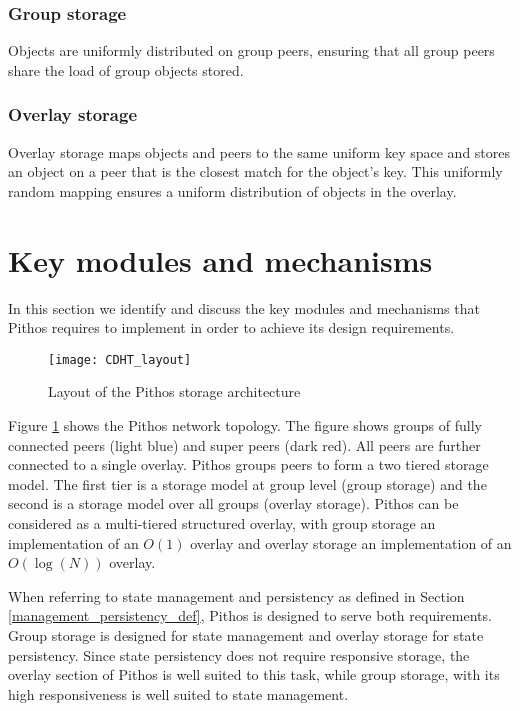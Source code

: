 \subsubsection{Group storage}

Objects are uniformly distributed on group peers, ensuring that all group peers share the load of group objects stored.

\subsubsection{Overlay storage}

Overlay storage maps objects and peers to the same uniform key space and stores an object on a peer that is the closest match for the object's key. This uniformly random mapping ensures a uniform distribution of objects in the overlay.

\section{Key modules and mechanisms}
\label{key_modules_mechs}

In this section we identify and discuss the key modules and mechanisms that Pithos requires to implement in order to achieve its design requirements.

\begin{figure}[htbp]
 \centering
 \texttt{[image: CDHT\_layout]}
 \caption{Layout of the Pithos storage architecture}
 \label{fig_pithos}
\end{figure}
%
Figure \ref{fig_pithos} shows the Pithos network topology. The figure shows groups of fully connected peers (light blue) and super peers (dark red). All peers are further connected to a single overlay. Pithos groups peers to form a two tiered storage model. The first tier is a storage model at group level (group storage) and the second is a storage model over all groups (overlay storage). Pithos can be considered as a multi-tiered structured overlay, with group storage an implementation of an $O(1)$ overlay and overlay storage an implementation of an $O(\log (N))$ overlay.

When referring to state management and persistency as defined in Section \ref{management_persistency_def}, Pithos is designed to serve both requirements. Group storage is designed for state management and overlay storage for state persistency. Since state persistency does not require responsive storage, the overlay section of Pithos is well suited to this task, while group storage, with its high responsiveness is well suited to state management.

